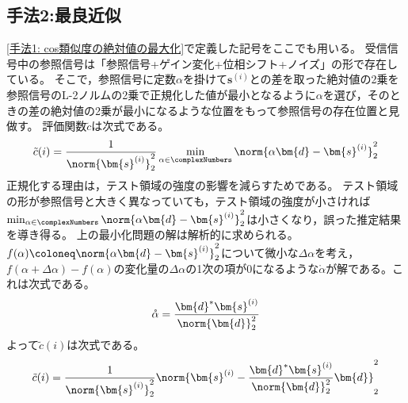         \subsection{手法2:最良近似}
            \ref{手法1: cos類似度の絶対値の最大化}で定義した記号をここでも用いる。
            受信信号中の参照信号は「参照信号+ゲイン変化+位相シフト+ノイズ」の形で存在している。
            そこで，参照信号に定数$\alpha$を掛けて$\bm{s}^{(i)}$との差を取った絶対値の2乗を参照信号のL-2ノルムの2乗で正規化した値が最小となるように$\alpha$を選び，そのときの差の絶対値の2乗が最小になるような位置をもって参照信号の存在位置と見做す。
            評価関数$\tilde{c}$は次式である。
            \[ \tilde{c}(i) = \frac{1}{\norm{\bm{s}^{(i)}}_2^2}\min_{\alpha \in \complexNumbers}\norm{\alpha\bm{d} - \bm{s}^{(i)}}_2^2 \]
            正規化する理由は，テスト領域の強度の影響を減らすためである。
            テスト領域の形が参照信号と大きく異なっていても，テスト領域の強度が小さければ$\min_{\alpha \in \complexNumbers}\norm{\alpha\bm{d} - \bm{s}^{(i)}}_2^2$は小さくなり，誤った推定結果を導き得る。
            上の最小化問題の解は解析的に求められる。
            $f(\alpha) \coloneq \norm{\alpha\bm{d} - \bm{s}^{(i)}}_2^2$について微小な$\Delta\alpha$を考え，$f(\alpha+\Delta\alpha) - f(\alpha)$の変化量の$\Delta\alpha$の1次の項が0になるような$\mathring{\alpha}$が解である。これは次式である。
            \[
                \mathring{\alpha} = \frac{\bm{d}^*\bm{s}^{(i)}}{\norm{\bm{d}}_2^2}
            \]
            よって$\tilde{c}(i)$は次式である。
            \[ \tilde{c}(i) = \frac{1}{\norm{\bm{s}^{(i)}}_2^2}\norm{\bm{s}^{(i)} - \frac{\bm{d}^*\bm{s}^{(i)}}{\norm{\bm{d}}_2^2}\bm{d}}_2^2 \]
